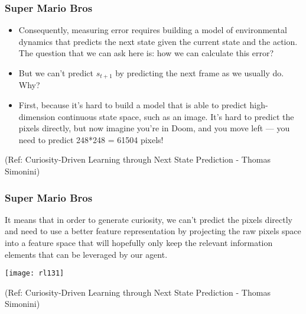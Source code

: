 \begin{frame}[fragile]\frametitle{Super Mario Bros}


\begin{itemize}
\item Consequently, measuring error requires building a model of environmental dynamics that predicts the next state given the current state and the action. The question that we can ask here is: how we can calculate this error?
\item But we can’t predict $s_{t+1}$ by predicting the next frame as we usually do. Why?
\item First, because it’s hard to build a model that is able to predict high-dimension continuous state space, such as an image. It’s hard to predict the pixels directly, but now imagine you’re in Doom, and you move left — you need to predict 248*248 = 61504 pixels!
\end{itemize}

{\tiny (Ref: Curiosity-Driven Learning through Next State Prediction - Thomas Simonini)}


\end{frame}

\begin{frame}[fragile]\frametitle{Super Mario Bros}


It means that in order to generate curiosity, we can’t predict the pixels directly and need to use a better feature representation by projecting the raw pixels space into a feature space that will hopefully only keep the relevant information elements that can be leveraged by our agent.


\begin{center}
\texttt{[image: rl131]}
\end{center}

{\tiny (Ref: Curiosity-Driven Learning through Next State Prediction - Thomas Simonini)}


\end{frame}

